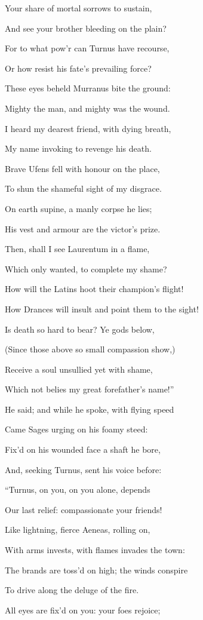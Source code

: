 Your share of mortal sorrows to sustain,

And see your brother bleeding on the plain?

For to what pow’r can Turnus have recourse,

Or how resist his fate’s prevailing force?

These eyes beheld Murranus bite the ground:

Mighty the man, and mighty was the wound.

I heard my dearest friend, with dying breath,

My name invoking to revenge his death.

Brave Ufens fell with honour on the place,

To shun the shameful sight of my disgrace.

On earth supine, a manly corpse he lies;

His vest and armour are the victor’s prize.

Then, shall I see Laurentum in a flame,

Which only wanted, to complete my shame?

How will the Latins hoot their champion’s flight!

How Drances will insult and point them to the sight!

Is death so hard to bear? Ye gods below,

(Since those above so small compassion show,)

Receive a soul unsullied yet with shame,

Which not belies my great forefather’s name!”

He said; and while he spoke, with flying speed

Came Sages urging on his foamy steed:

Fix’d on his wounded face a shaft he bore,

And, seeking Turnus, sent his voice before:

“Turnus, on you, on you alone, depends

Our last relief: compassionate your friends!

Like lightning, fierce Aeneas, rolling on,

With arms invests, with flames invades the town:

The brands are toss’d on high; the winds conspire

To drive along the deluge of the fire.

All eyes are fix’d on you: your foes rejoice;

